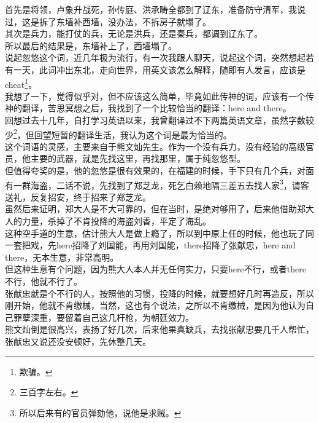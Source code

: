 \begin{multicols}{\theparacolNo}
首先是将领，卢象升战死，孙传庭、洪承畴全都到了辽东，准备防守清军，我说过，这是拆了东墙补西墙，没办法，不拆房子就塌了。\\

其次是兵力，能打仗的兵，无论是洪兵，还是秦兵，都调到辽东了。\\

所以最后的结果是，东墙补上了，西墙塌了。\\

说起忽悠这个词，近几年极为流行，有一次我跟人聊天，说起这个词，突然想起若有一天，此词冲出东北，走向世界，用英文该怎么解释，随即有人发言，应该是cheat\footnote{欺骗。}。\\

我想了一下，觉得似乎对，但不应该这么简单，毕竟如此传神的词，应该有一个传神的翻译，苦思冥想之后，我找到了一个比较恰当的翻译：here and there。\\

回想过去十几年，自打学习英语以来，我曾翻译过不下两篇英语文章，虽然字数较少\footnote{三百字左右。}，但回望短暂的翻译生活，我认为这个词是最为恰当的。\\

这个词语的灵感，主要来自于熊文灿先生。作为一个没有兵力，没有经验的高级官员，他主要的武器，就是先找这里，再找那里，属于纯忽悠型。\\

但值得夸奖的是，他的忽悠是很有效果的，在福建的时候，手下只有几个兵，对面有一群海盗，二话不说，先找到了郑芝龙，死乞白赖地隔三差五去找人家\footnote{所以后来有的官员弹劾他，说他是求贼。}，请客送礼，反复招安，终于招来了郑芝龙。\\

虽然后来证明，郑大人是不大可靠的，但在当时，是绝对够用了，后来他借助郑大人的力量，杀掉了不肯投降的海盗刘香，平定了海乱。\\

这种空手道的生意，估计熊大人是做上瘾了，所以到中原上任的时候，他也玩了同一套把戏，先here招降了刘国能，再用刘国能，there招降了张献忠，here and there，无本生意，非常高明。\\

但这种生意有个问题，因为熊大人本人并无任何实力，只要here不行，或者there不行，他就不行了。\\

张献忠就是个不行的人，按照他的习惯，投降的时候，就要想好几时再造反，所以刚开始，他就不肯缴械，当然，这也有个说法，之所以不肯缴械，是因为他认为自己罪孽深重，要留着自己这几杆枪，为朝廷效力。\\

熊文灿倒是很高兴，表扬了好几次，后来他果真缺兵，去找张献忠要几千人帮忙，张献忠又说还没安顿好，先休整几天。\\


\end{multicols}
